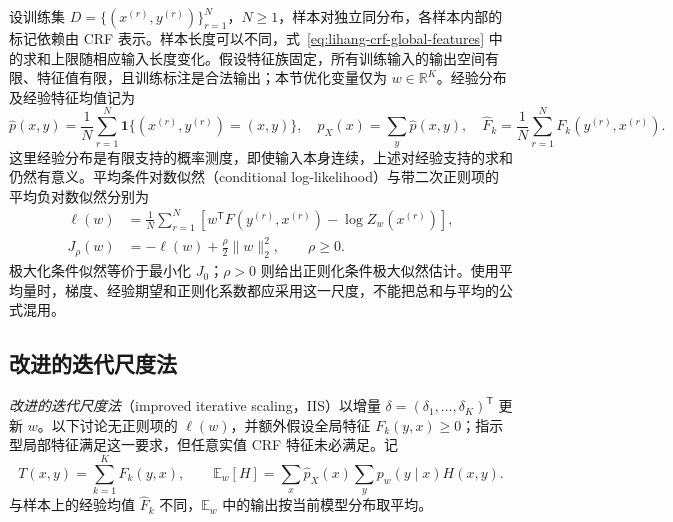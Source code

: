 设训练集 $D=\{(x^{(r)},y^{(r)})\}_{r=1}^N$，$N\geq1$，样本对独立同分布，各样本内部的标记依赖由 CRF 表示。样本长度可以不同，式~\eqref{eq:lihang-crf-global-features} 中的求和上限随相应输入长度变化。假设特征族固定，所有训练输入的输出空间有限、特征值有限，且训练标注是合法输出；本节优化变量仅为 $w\in\mathbb R^K$。经验分布及经验特征均值记为
\[
  \widehat p(x,y)=\frac1N\sum_{r=1}^N
          \mathbf1\{(x^{(r)},y^{(r)})=(x,y)\},\quad
  \widehat p_X(x)=\sum_y\widehat p(x,y),\quad
  \widehat F_k=\frac1N\sum_{r=1}^N F_k(y^{(r)},x^{(r)}).
\]
这里经验分布是有限支持的概率测度，即使输入本身连续，上述对经验支持的求和仍然有意义。平均条件对数似然（conditional log-likelihood）与带二次正则项的平均负对数似然分别为
\begin{align}
\label{eq:lihang-crf-log-likelihood}
  \ell(w)&=\frac1N\sum_{r=1}^N
    \left[w^{\mathsf T}F(y^{(r)},x^{(r)})-\log Z_w(x^{(r)})\right],\\
\label{eq:lihang-crf-objective}
  J_\rho(w)&=-\ell(w)+\frac\rho2\lVert w\rVert_2^2,\qquad \rho\geq0.
\end{align}
极大化条件似然等价于最小化 $J_0$；$\rho>0$ 则给出正则化条件极大似然估计。使用平均量时，梯度、经验期望和正则化系数都应采用这一尺度，不能把总和与平均的公式混用。

\subsection{改进的迭代尺度法}
\label{subsec:lihang-crf-iis}

\emph{改进的迭代尺度法}（improved iterative scaling，IIS）以增量 $\delta=(\delta_1,\ldots,\delta_K)^{\mathsf T}$ 更新 $w$。以下讨论无正则项的 $\ell(w)$，并额外假设全局特征 $F_k(y,x)\geq0$；指示型局部特征满足这一要求，但任意实值 CRF 特征未必满足。记
\[
  T(x,y)=\sum_{k=1}^K F_k(y,x),\qquad
  \mathbb E_w[H]=\sum_x\widehat p_X(x)\sum_y p_w(y\mid x)H(x,y).
\]
与样本上的经验均值 $\widehat F_k$ 不同，$\mathbb E_w$ 中的输出按当前模型分布取平均。

